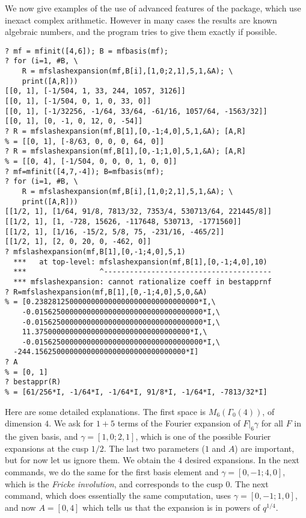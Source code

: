 \documentclass[11pt]{article}
\newcommand{\ga}{\gamma}
\newcommand{\G}{\Gamma}
\begin{document}
We now give examples of the use of advanced features of the package,
which use inexact complex arithmetic. However in many cases the results
are known algebraic numbers, and the program tries to give them exactly
if possible.

\begin{verbatim}
? mf = mfinit([4,6]); B = mfbasis(mf);
? for (i=1, #B, \
    R = mfslashexpansion(mf,B[i],[1,0;2,1],5,1,&A); \
    print([A,R]))
[[0, 1], [-1/504, 1, 33, 244, 1057, 3126]]
[[0, 1], [-1/504, 0, 1, 0, 33, 0]]
[[0, 1], [-1/32256, -1/64, 33/64, -61/16, 1057/64, -1563/32]]
[[0, 1], [0, -1, 0, 12, 0, -54]]
? R = mfslashexpansion(mf,B[1],[0,-1;4,0],5,1,&A); [A,R]
% = [[0, 1], [-8/63, 0, 0, 0, 64, 0]]
? R = mfslashexpansion(mf,B[1],[0,-1;1,0],5,1,&A); [A,R]
% = [[0, 4], [-1/504, 0, 0, 0, 1, 0, 0]]
? mf=mfinit([4,7,-4]); B=mfbasis(mf);
? for (i=1, #B, \
    R = mfslashexpansion(mf,B[i],[1,0;2,1],5,1,&A); \
    print([A,R]))
[[1/2, 1], [1/64, 91/8, 7813/32, 7353/4, 530713/64, 221445/8]]
[[1/2, 1], [1, -728, 15626, -117648, 530713, -1771560]]
[[1/2, 1], [1/16, -15/2, 5/8, 75, -231/16, -465/2]]
[[1/2, 1], [2, 0, 20, 0, -462, 0]]
? mfslashexpansion(mf,B[1],[0,-1;4,0],5,1)
  ***   at top-level: mfslashexpansion(mf,B[1],[0,-1;4,0],10)
  ***                 ^---------------------------------------
  *** mfslashexpansion: cannot rationalize coeff in bestapprnf
? R=mfslashexpansion(mf,B[1],[0,-1;4,0],5,0,&A)
% = [0.23828125000000000000000000000000000000*I,\
    -0.015625000000000000000000000000000000000*I,\
    -0.015625000000000000000000000000000000000*I,\
    11.375000000000000000000000000000000000*I,\
    -0.015625000000000000000000000000000000000*I,\
  -244.15625000000000000000000000000000000*I]
? A
% = [0, 1]
? bestappr(R)
% = [61/256*I, -1/64*I, -1/64*I, 91/8*I, -1/64*I, -7813/32*I]
\end{verbatim}

  Here are some detailed explanations. The first space is $M_6(\G_0(4))$,
  of dimension $4$. We ask for $1+5$ terms of the Fourier expansion of
  $F|_6\ga$ for all $F$ in the given basis, and $\ga=[1,0;2,1]$, which is one
  of the possible Fourier expansions at the cusp $1/2$. The last two parameters
  ($1$ and $A$) are important, but for now let us ignore them.
  We obtain the $4$ desired expansions. In the next commands, we do the same
  for the first basis element and $\ga=[0,-1;4,0]$, which is the
  \emph{Fricke involution}, and corresponds to the cusp $0$. The next
  command, which does essentially the same computation, uses $\ga=[0,-1;1,0]$,
  and now $A=[0,4]$ which tells us that the expansion is in powers of
  $q^{1/4}$.
\end{document}
